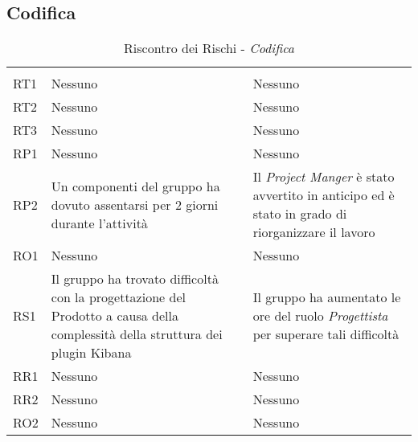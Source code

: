 \subsection{Codifica}
\label{sec:CodificaRischi}
\begin{table}[H]
	\centering
	\begin{tabular}{|C{2.5cm}|C{5cm}|C{5cm}|}
		 & & \\
		RT1  & Nessuno & Nessuno \\
		\hline
		RT2  & Nessuno & Nessuno \\
		\hline
		RT3  & Nessuno & Nessuno \\
		\hline
		RP1  & Nessuno & Nessuno \\
		\hline
		RP2  & Un componenti del gruppo ha dovuto assentarsi per 2 giorni durante l'attività & Il \textit{Project Manger} è stato avvertito in anticipo ed è stato in grado di riorganizzare il lavoro \\
		\hline
		RO1  & Nessuno & Nessuno \\
		\hline
		RS1  & Il gruppo ha trovato difficoltà con la progettazione del Prodotto a causa della complessità della struttura dei plugin Kibana & Il gruppo ha aumentato le ore del ruolo \textit{Progettista} per superare tali difficoltà \\
		\hline
		RR1  & Nessuno & Nessuno \\
		\hline
		RR2  & Nessuno & Nessuno \\
		\hline
		RO2  & Nessuno & Nessuno \\
		\hline
	\end{tabular}
	\caption{Riscontro dei Rischi - \textit{Codifica}}
\end{table}




